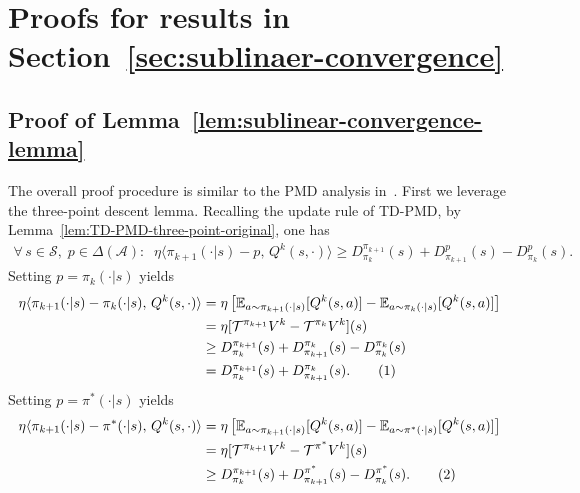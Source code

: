 \documentclass[10pt]{article}
\newcommand{\calA}{\mathcal{A}}
\newcommand{\calS}{\mathcal{S}}
\newcommand{\calT}{\mathcal{T}}
\newcommand{\E}{\mathbb{E}}
\newcommand{\ls}{\left}
\newcommand{\rs}{\right}
\newcommand\numberthis{\addtocounter{equation}{1}\tag{\theequation}}
\theoremstyle{plain}
\theoremstyle{definition}
\begin{document}
\section{Proofs for results in Section~\ref{sec:sublinaer-convergence}}
\subsection{Proof of Lemma~\ref{lem:sublinear-convergence-lemma}}
\label{sec:pf:lem:sublinear-convergence-lemma}
The overall proof procedure is similar to the PMD analysis in~\cite{Xiao_2022,Lan_2021}. First we leverage the three-point descent lemma. Recalling the update rule of TD-PMD, by Lemma~\ref{lem:TD-PMD-three-point-original}, one has
\begin{align*}
    \forall\, s\in\calS,\; p\in\Delta(\calA): \;\; \eta \langle \pi_{k+1}(\cdot|s) - p, \, Q^k(s,\cdot) \rangle \geq D^{\pi_{k+1}}_{\pi_k}(s) + D^p_{\pi_{k+1}}(s) - D^p_{\pi_k}(s).
\end{align*}
Setting $p = \pi_k(\cdot|s)$ yields %
\begin{align*}
    \eta \langle \pi_{k+1}(\cdot|s) - \pi_k(\cdot|s), \, Q^k(s,\cdot) \rangle &= \eta \ls[ \E_{a\sim\pi_{k+1}(\cdot|s)}[Q^k(s,a)] - \E_{a\sim\pi_k(\cdot|s)}[Q^k(s,a)] \rs] \\
    &= \eta [\calT^{\pi_{k+1}}V^k - \calT^{\pi_k}V^k](s) \\
    &\geq D^{\pi_{k+1}}_{\pi_k}(s) + D^{\pi_k}_{\pi_{k+1}}(s) - D^{\pi_k}_{\pi_k}(s) \\
    &= D^{\pi_{k+1}}_{\pi_k}(s) + D^{\pi_k}_{\pi_{k+1}}(s). \numberthis \label{eq:TD-PMD-three-point-1}
\end{align*}
Setting $p = \pi^*(\cdot|s)$ yields %
\begin{align*}
    \eta \langle \pi_{k+1}(\cdot|s) - \pi^*(\cdot|s), \, Q^k(s,\cdot) \rangle &= \eta \ls[ \E_{a\sim\pi_{k+1}(\cdot|s)}[Q^k(s,a)] - \E_{a\sim\pi^*(\cdot|s)}[Q^k(s,a)] \rs] \\
    &= \eta [\calT^{\pi_{k+1}}V^k - \calT^{\pi^*}V^k](s) \\
    &\geq D^{\pi_{k+1}}_{\pi_k}(s) + D^{\pi^*}_{\pi_{k+1}}(s) - D^{\pi^*}_{\pi_k}(s). \numberthis \label{eq:TD-PMD-three-point-2}
\end{align*}
\end{document}
